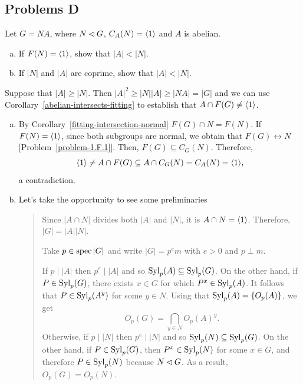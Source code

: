 \subsection{Problems D}

\begin{probl} Let\/ $G=NA$, where\/ $N\lhd G$, $C_A(N)=\langle1\rangle$ and\/ $A$ is abelian.
    \begin{enumerate}[a),font=\upshape]
    \item If\/ $F(N)=\langle1\rangle$, show that\/ $|A|<|N|$.
    \item If\/ $|N|$ and\/ $|A|$ are coprime, show that\/ $|A|<|N|$.
    \end{enumerate}
\end{probl} 

\begin{solution} Suppose that $|A|\ge|N|$. Then $|A|^2\ge|N||A|\ge |NA|=|G|$ and we can use Corollary~\ref{abelian-intersects-fitting} to establish that $A\cap F(G)\ne\langle1\rangle$.

\begin{enumerate}[a),font=\upshape]
    \item By Corollary~\ref{fitting-intersection-normal} $F(G)\cap N=F(N)$. If $F(N)=\langle1\rangle$, since both subgroups are normal, we obtain that $F(G)\leftrightarrow N$ [Problem~\ref{problem-1.F.1}]. Then, $F(G)\subseteq C_G(N)$. Therefore,
    $$
        \langle1\rangle\ne A\cap F(G)\subseteq A\cap C_G(N)=C_A(N)=\langle1\rangle,
    $$
    a contradiction.
        
    \item Let's take the opportunity to see some preliminaries
    
    \begin{quote}\small
        Since $|A\cap N|$ divides both $|A|$ and $|N|$, it is $A\cap N=\langle1\rangle$. Therefore, $|G|=|A||N|$.
        
        Take $p\in\operatorname{spec}|G|$ and write $|G|=p^em$ with $e>0$ and $p\perp m$.
        
        If $p\mid|A|$ then $p^e\mid |A|$ and so ${\rm Syl}_p(A)\subseteq{\rm Syl}_p(G)$. On the other hand, if $P\in{\rm Syl}_p(G)$, there exists $x\in G$ for which $P^x\in{\rm Syl}_p(A)$. It follows that $P\in{\rm Syl}_p(A^y)$ for some $y\in N$. Using that ${\rm Syl}_p(A)=\{O_p(A)\}$, we get
        $$
            O_p(G)=\bigcap_{y\in N}O_p(A)^y.
        $$
        Otherwise, if $p\mid|N|$ then $p^e\mid|N|$ and so ${\rm Syl}_p(N)\subseteq{\rm Syl}_p(G)$. On the other hand, if $P\in{\rm Syl}_p(G)$, then $P^x\in{\rm Syl}_p(N)$ for some $x\in G$, and therefore $P\in{\rm Syl}_p(N)$ because $N\lhd G$. As a result, $O_p(G)=O_p(N)$.
    

\end{quote}
\end{enumerate}
\end{solution}
